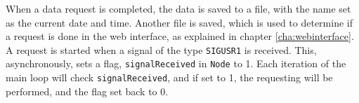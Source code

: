 When a data request is completed, the data is saved to a file, with the name set as the current date and time. Another file is saved, which is used to determine if a request is done in the web interface, as explained in chapter \ref{cha:webinterface}. A request is started when a signal of the type \texttt{SIGUSR1} is received. This, asynchronously, sets a flag, \texttt{signalReceived} in \texttt{Node} to 1. Each iteration of the main loop will check \texttt{signalReceived}, and if set to 1, the requesting will be performed, and the flag set back to 0.
